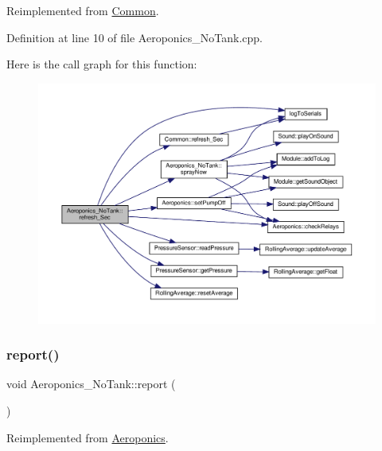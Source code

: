 Reimplemented from \hyperlink{class_common_acd1fdd47fbf8bb490f5c6d3ab6cd8d05}{Common}.



Definition at line 10 of file Aeroponics\+\_\+\+No\+Tank.\+cpp.

Here is the call graph for this function\+:
\nopagebreak
\begin{figure}[H]
\begin{center}
\leavevmode
\includegraphics[width=350pt]{class_aeroponics___no_tank_a8e0130107832f0a60d37ea581f6f67fb_cgraph}
\end{center}
\end{figure}
\mbox{\label{class_aeroponics___no_tank_af2f6dfdcfd4365ed35aa83176113ff86}} 
\subsubsection{\texorpdfstring{report()}{report()}\hspace{0.1cm}{\footnotesize\ttfamily [1/2]}}
{\footnotesize\ttfamily void Aeroponics\+\_\+\+No\+Tank\+::report (\begin{DoxyParamCaption}{ }\end{DoxyParamCaption})\hspace{0.3cm}{\ttfamily [virtual]}}



Reimplemented from \hyperlink{class_aeroponics_a3dbfce027ab5fa736a6007a6ae75ee4e}{Aeroponics}.



